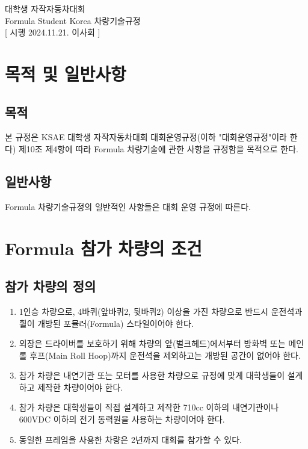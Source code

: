 \documentclass[final,a4paper,10pt]{report}
\begin{document}
\thispagestyle{firstpage}

\begin{center}
  {\fontsize{22}{25}\selectfont\pretendardb 대학생 자작자동차대회}\\[2.5ex]
  {\fontsize{22}{25}\selectfont\pretendardb Formula Student Korea 차량기술규정}\\[2.5ex]
  [ 시행 2024.11.21. 이사회 ]
\end{center}

\chapter{목적 및 일반사항}

\section{목적}
본 규정은 KSAE 대학생 자작자동차대회 대회운영규정(이하 "대회운영규정"이라 한다) 제10조 제4항에 따라 Formula 차량기술에 관한 사항을 규정함을 목적으로 한다.

\section{일반사항}
Formula 차량기술규정의 일반적인 사항들은 대회 운영 규정에 따른다.

\chapter{Formula 참가 차량의 조건}

\section{참가 차량의 정의}
\begin{enumerate}
  \item 1인승 차량으로, 4바퀴(앞바퀴2, 뒷바퀴2) 이상을 가진 차량으로 반드시 운전석과 휠이 개방된 포뮬러(Formula) 스타일이어야 한다.
  \item 외장은 드라이버를 보호하기 위해 차량의 앞(벌크헤드)에서부터 방화벽 또는 메인 롤 후프(Main Roll Hoop)까지 운전석을 제외하고는 개방된 공간이 없어야 한다.
  \item 참가 차량은 내연기관 또는 모터를 사용한 차량으로 규정에 맞게 대학생들이 설계하고 제작한 차량이어야 한다.
  \item 참가 차량은 대학생들이 직접 설계하고 제작한 710cc 이하의 내연기관이나 600VDC 이하의 전기 동력원을 사용하는 차량이어야 한다.
  \item 동일한 프레임을 사용한 차량은 2년까지 대회를 참가할 수 있다. 
\end{enumerate}
\end{document}
